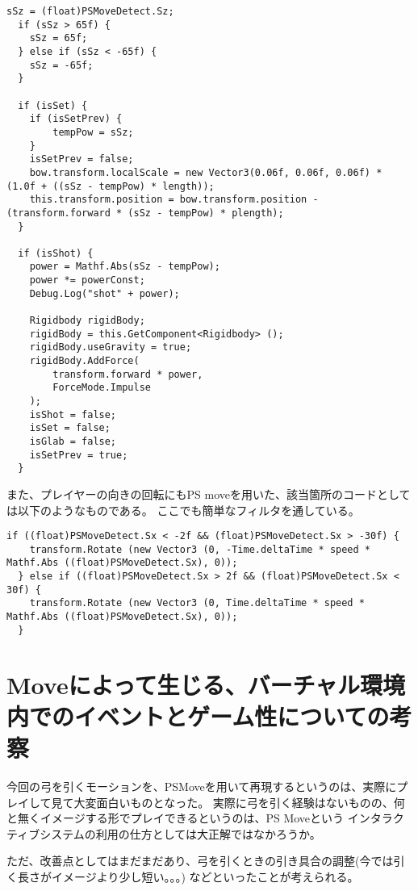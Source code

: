 \documentclass[11pt,a4j]{jsarticle}
\begin{document}
\begin{lstlisting}[basicstyle=\ttfamily\footnotesize, caption=弓の引く強さの設定部分]
  sSz = (float)PSMoveDetect.Sz;
  if (sSz > 65f) {
  	sSz = 65f;
  } else if (sSz < -65f) {
  	sSz = -65f;
  }

  if (isSet) {
  	if (isSetPrev) {
  		tempPow = sSz;
  	}
  	isSetPrev = false;
  	bow.transform.localScale = new Vector3(0.06f, 0.06f, 0.06f) * (1.0f + ((sSz - tempPow) * length));
  	this.transform.position = bow.transform.position - (transform.forward * (sSz - tempPow) * plength);
  }

  if (isShot) {
  	power = Mathf.Abs(sSz - tempPow);
  	power *= powerConst;
  	Debug.Log("shot" + power);

  	Rigidbody rigidBody;
  	rigidBody = this.GetComponent<Rigidbody> ();
  	rigidBody.useGravity = true;
  	rigidBody.AddForce(
  		transform.forward * power,
  		ForceMode.Impulse
  	);
  	isShot = false;
  	isSet = false;
    isGlab = false;
  	isSetPrev = true;
  }
\end{lstlisting}

また、プレイヤーの向きの回転にもPS moveを用いた、該当箇所のコードとしては以下のようなものである。
ここでも簡単なフィルタを通している。

\begin{lstlisting}[basicstyle=\ttfamily\footnotesize, caption=PSMoveを用いたプレイヤーの移動]
  if ((float)PSMoveDetect.Sx < -2f && (float)PSMoveDetect.Sx > -30f) {
    transform.Rotate (new Vector3 (0, -Time.deltaTime * speed * Mathf.Abs ((float)PSMoveDetect.Sx), 0));
  } else if ((float)PSMoveDetect.Sx > 2f && (float)PSMoveDetect.Sx < 30f) {
    transform.Rotate (new Vector3 (0, Time.deltaTime * speed * Mathf.Abs ((float)PSMoveDetect.Sx), 0));
  }
\end{lstlisting}


\section{Moveによって生じる、バーチャル環境内でのイベントとゲーム性についての考察}

今回の弓を引くモーションを、PSMoveを用いて再現するというのは、実際にプレイして見て大変面白いものとなった。
実際に弓を引く経験はないものの、何と無くイメージする形でプレイできるというのは、PS Moveという
インタラクティブシステムの利用の仕方としては大正解ではなかろうか。

ただ、改善点としてはまだまだあり、弓を引くときの引き具合の調整(今では引く長さがイメージより少し短い。。。)
などといったことが考えられる。
\end{document}
